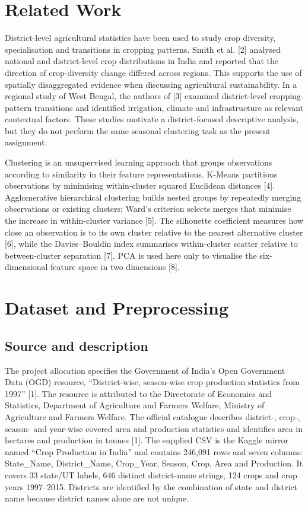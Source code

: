 \documentclass[9pt,a4paper,twocolumn]{extarticle}
\begin{document}
\section{Related Work}
District-level agricultural statistics have been used to study crop diversity, specialisation and transitions in cropping patterns. Smith et al. [2] analysed national and district-level crop distributions in India and reported that the direction of crop-diversity change differed across regions. This supports the use of spatially disaggregated evidence when discussing agricultural sustainability. In a regional study of West Bengal, the authors of [3] examined district-level cropping-pattern transitions and identified irrigation, climate and infrastructure as relevant contextual factors. These studies motivate a district-focused descriptive analysis, but they do not perform the same seasonal clustering task as the present assignment.

Clustering is an unsupervised learning approach that groups observations according to similarity in their feature representations. K-Means partitions observations by minimising within-cluster squared Euclidean distances [4]. Agglomerative hierarchical clustering builds nested groups by repeatedly merging observations or existing clusters; Ward's criterion selects merges that minimise the increase in within-cluster variance [5]. The silhouette coefficient measures how close an observation is to its own cluster relative to the nearest alternative cluster [6], while the Davies--Bouldin index summarises within-cluster scatter relative to between-cluster separation [7]. PCA is used here only to visualise the six-dimensional feature space in two dimensions [8].

\section{Dataset and Preprocessing}
\subsection{Source and description}
The project allocation specifies the Government of India's Open Government Data (OGD) resource, ``District-wise, season-wise crop production statistics from 1997'' [1]. The resource is attributed to the Directorate of Economics and Statistics, Department of Agriculture and Farmers Welfare, Ministry of Agriculture and Farmers Welfare. The official catalogue describes district-, crop-, season- and year-wise covered area and production statistics and identifies area in hectares and production in tonnes [1]. The supplied CSV is the Kaggle mirror named ``Crop Production in India'' and contains 246,091 rows and seven columns: State\_Name, District\_Name, Crop\_Year, Season, Crop, Area and Production. It covers 33 state/UT labels, 646 distinct district-name strings, 124 crops and crop years 1997--2015. Districts are identified by the combination of state and district name because district names alone are not unique.
\end{document}
